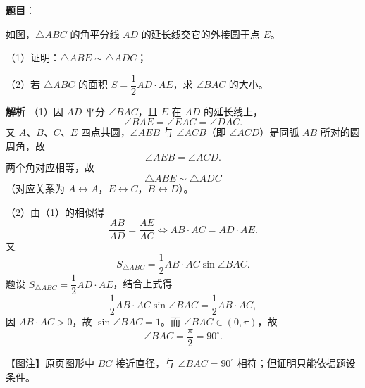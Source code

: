 \begin{answer}

\textbf{题目}：

如图，$\triangle ABC$ 的角平分线 $AD$ 的延长线交它的外接圆于点 $E$。

（1）证明：$\triangle ABE\sim\triangle ADC$；

（2）若 $\triangle ABC$ 的面积 $S=\dfrac12AD\cdot AE$，求 $\angle BAC$ 的大小。
\nopagebreak[4]
\begin{center}\end{center}
\nopagebreak[4]
\textbf{解析}
（1）因 $AD$ 平分 $\angle BAC$，且 $E$ 在 $AD$ 的延长线上，
\nopagebreak[4]
\[\angle BAE=\angle EAC=\angle DAC.\]
又 $A$、$B$、$C$、$E$ 四点共圆，$\angle AEB$ 与 $\angle ACB$（即 $\angle ACD$）是同弧 $AB$ 所对的圆周角，故
\nopagebreak[4]
\[\angle AEB=\angle ACD.\]
两个角对应相等，故
\nopagebreak[4]
\[\triangle ABE\sim\triangle ADC\]
（对应关系为 $A\leftrightarrow A$，$E\leftrightarrow C$，$B\leftrightarrow D$）。

（2）由（1）的相似得
\nopagebreak[4]
\[\frac{AB}{AD}=\frac{AE}{AC}\iff AB\cdot AC=AD\cdot AE.\]
又
\nopagebreak[4]
\[S_{\triangle ABC}=\frac12AB\cdot AC\sin\angle BAC.\]
题设 $S_{\triangle ABC}=\dfrac12AD\cdot AE$，结合上式得
\nopagebreak[4]
\[\frac12AB\cdot AC\sin\angle BAC=\frac12AB\cdot AC,\]
因 $AB\cdot AC>0$，故 $\sin\angle BAC=1$。而 $\angle BAC\in(0,\pi)$，故
\nopagebreak[4]
\[\angle BAC=\frac{\pi}{2}=90^\circ.\]

【图注】原页图形中 $BC$ 接近直径，与 $\angle BAC=90^\circ$ 相符；但证明只能依据题设条件。


\end{answer}
